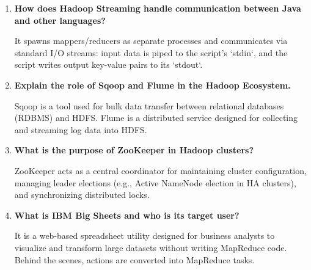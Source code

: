 \documentclass[12pt,a4paper]{article}
\newcommand{\Q}[1]{\textbf{#1}\par\noindent\ignorespaces}
\begin{document}
\begin{tcolorbox}[exambox, title={\textbf{Frequently Asked / Viva Questions}}]
\begin{enumerate}[leftmargin=*, topsep=0pt, label=\textbf{Q\arabic*.}, itemsep=5pt]
  \item \Q{How does Hadoop Streaming handle communication between Java and other languages?}
        It spawns mappers/reducers as separate processes and communicates via standard I/O streams: input data is piped to the script's `stdin`, and the script writes output key-value pairs to its `stdout`.
        
  \item \Q{Explain the role of Sqoop and Flume in the Hadoop Ecosystem.}
        Sqoop is a tool used for bulk data transfer between relational databases (RDBMS) and HDFS. Flume is a distributed service designed for collecting and streaming log data into HDFS.
        
  \item \Q{What is the purpose of ZooKeeper in Hadoop clusters?}
        ZooKeeper acts as a central coordinator for maintaining cluster configuration, managing leader elections (e.g., Active NameNode election in HA clusters), and synchronizing distributed locks.
        
  \item \Q{What is IBM Big Sheets and who is its target user?}
        It is a web-based spreadsheet utility designed for business analysts to visualize and transform large datasets without writing MapReduce code. Behind the scenes, actions are converted into MapReduce tasks.
\end{enumerate}
\end{tcolorbox}

\vspace{6pt}
\end{document}
